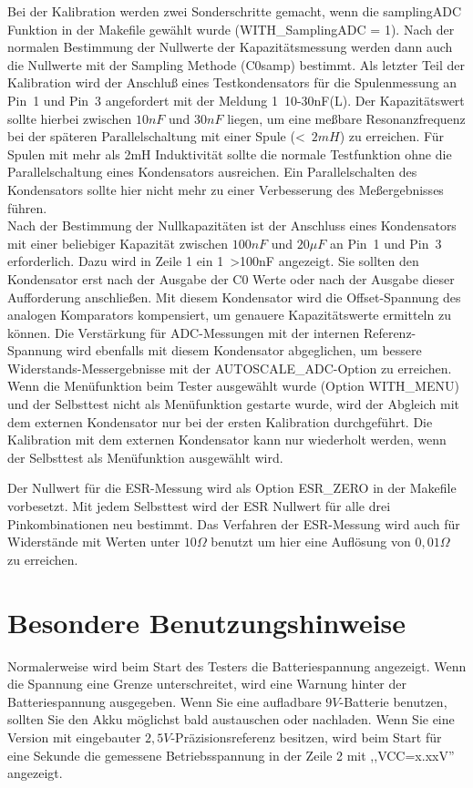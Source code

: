 Bei der Kalibration werden zwei Sonderschritte gemacht, wenn die samplingADC Funktion in der Makefile gewählt wurde (WITH\_SamplingADC = 1).
Nach der normalen Bestimmung der Nullwerte der Kapazitätsmessung werden dann auch die Nullwerte mit
der Sampling Methode (C0samp) bestimmt. Als letzter Teil der Kalibration wird der Anschluß eines Testkondensators für die
Spulenmessung an Pin~1 und Pin~3 angefordert mit der Meldung \mbox{1   10-30nF(L)}.
Der Kapazitätswert sollte hierbei zwischen \(10nF\) und \(30nF\) liegen,
um eine meßbare Resonanzfrequenz bei der späteren Parallelschaltung mit einer Spule (\textless~\(2mH\)) zu erreichen.
Für Spulen mit mehr als 2mH Induktivität sollte die normale Testfunktion ohne die Parallelschaltung eines
Kondensators ausreichen. Ein Parallelschalten des Kondensators sollte hier nicht mehr 
zu einer Verbesserung des Meßergebnisses führen.\\

Nach der Bestimmung der Nullkapazitäten ist der Anschluss eines Kondensators 
mit einer beliebiger Kapazität zwischen \(100nF\) und \(20\mu F\) an Pin~1 und Pin~3 erforderlich.
Dazu wird in Zeile 1 ein \mbox{1 \textgreater 100nF} angezeigt.
Sie sollten den Kondensator erst nach der Ausgabe der C0 Werte oder nach der Ausgabe dieser Aufforderung anschließen.
Mit diesem Kondensator wird die Offset-Spannung des analogen Komparators kompensiert,
um genauere Kapazitätswerte ermitteln zu können.
Die Verstärkung für ADC-Messungen mit der internen Referenz-Spannung wird ebenfalls mit diesem Kondensator abgeglichen, um
bessere Widerstands-Messergebnisse mit der AUTOSCALE\_ADC-Option zu erreichen.
Wenn die Menüfunktion beim Tester ausgewählt wurde (Option WITH\_MENU) und der Selbsttest
nicht als Menüfunktion gestarte wurde, wird der Abgleich mit dem externen Kondensator nur bei
der ersten Kalibration durchgeführt.
Die Kalibration mit dem externen Kondensator kann nur wiederholt werden, wenn der Selbsttest
als Menüfunktion ausgewählt wird.

Der Nullwert für die ESR-Messung wird als Option ESR\_ZERO in der Makefile vorbesetzt.
Mit jedem Selbsttest wird der ESR Nullwert für alle drei Pinkombinationen neu bestimmt.
Das Verfahren der ESR-Messung wird auch für Widerstände mit Werten unter \(10\Omega\) benutzt um
hier eine Auflösung von \(0,01\Omega\) zu erreichen.

\section{Besondere Benutzungshinweise}
Normalerweise wird beim Start des Testers die Batteriespannung angezeigt. Wenn die Spannung eine Grenze unterschreitet, 
wird eine Warnung hinter der Batteriespannung ausgegeben. Wenn Sie eine aufladbare \(9V\)-Batterie benutzen, sollten Sie
den Akku möglichst bald austauschen oder nachladen.
Wenn Sie eine Version mit eingebauter \(2,5V\)-Präzisionsreferenz besitzen, wird beim Start für eine Sekunde die
gemessene Betriebsspannung in der Zeile 2 mit ,,VCC=x.xxV'' angezeigt.

